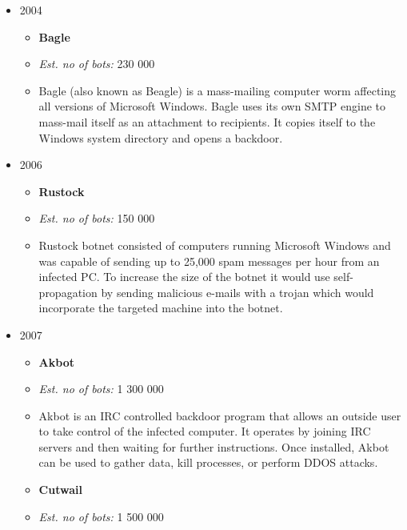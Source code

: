 \documentclass[]{article}
\begin{document}
\begin{itemize}
	\item {2004
\begin{itemize}
	\item \textbf{Bagle} \cite{website:bagle}

	\item \textit{Est. no of bots:} 230 000

	\item Bagle (also known as Beagle) is a mass-mailing computer worm affecting all versions of Microsoft Windows. Bagle uses its own SMTP engine to mass-mail itself as an attachment to recipients. It copies itself to the Windows system directory and opens a backdoor.
\end{itemize}
}

	\item {2006

\begin{itemize}
	\item \textbf{Rustock} \cite{website:rustock}

	\item \textit{Est. no of bots:} 150 000

	\item Rustock botnet consisted of computers running Microsoft Windows and was capable of sending up to 25,000 spam messages per hour from an infected PC. To increase the size of the botnet it would use self-propagation by sending malicious e-mails with a trojan which would incorporate the targeted machine into the botnet.
\end{itemize}
}

	\item {2007

\begin{itemize}
	\item \textbf{Akbot} \cite{website:akbot}

\item \textit{Est. no of bots:} 1 300 000

\item Akbot is an IRC controlled backdoor program that allows an outside user to take control of the infected computer. It operates by joining IRC servers and then waiting for further instructions. Once installed, Akbot can be used to gather data, kill processes, or perform DDOS attacks.

\item \textbf{Cutwail} \cite{website:cutwail}

\item \textit{Est. no of bots:} 1 500 000


\end{itemize}}
\end{itemize}
\end{document}
